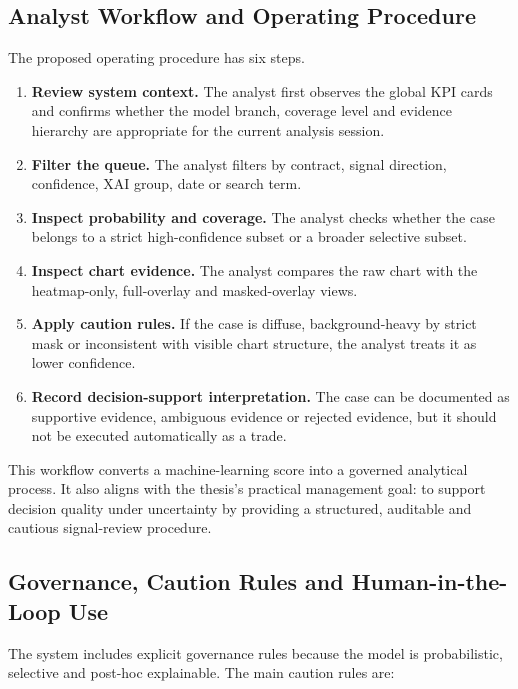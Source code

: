 \subsection{Analyst Workflow and Operating Procedure}
\label{subsec:analyst_workflow}

The proposed operating procedure has six steps.

\begin{enumerate}
    \item \textbf{Review system context.} The analyst first observes the global KPI cards and confirms whether the model branch, coverage level and evidence hierarchy are appropriate for the current analysis session.
    \item \textbf{Filter the queue.} The analyst filters by contract, signal direction, confidence, XAI group, date or search term.
    \item \textbf{Inspect probability and coverage.} The analyst checks whether the case belongs to a strict high-confidence subset or a broader selective subset.
    \item \textbf{Inspect chart evidence.} The analyst compares the raw chart with the heatmap-only, full-overlay and masked-overlay views.
    \item \textbf{Apply caution rules.} If the case is diffuse, background-heavy by strict mask or inconsistent with visible chart structure, the analyst treats it as lower confidence.
    \item \textbf{Record decision-support interpretation.} The case can be documented as supportive evidence, ambiguous evidence or rejected evidence, but it should not be executed automatically as a trade.
\end{enumerate}

This workflow converts a machine-learning score into a governed analytical process. It also aligns with the thesis's practical management goal: to support decision quality under uncertainty by providing a structured, auditable and cautious signal-review procedure.

\subsection{Governance, Caution Rules and Human-in-the-Loop Use}
\label{subsec:governance}

The system includes explicit governance rules because the model is probabilistic, selective and post-hoc explainable. The main caution rules are:


